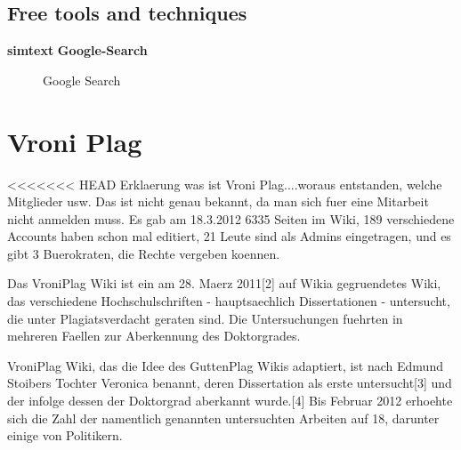 \newpage
\subsection{Free tools and techniques}

	\textbf{simtext}
	\textbf{Google-Search}

	 \begin{figure}[!h]
  \centering
  \caption{Google Search}
  \label{fig:Google Search}
\end{figure}






\newpage


\section{Vroni Plag}
<<<<<<< HEAD
Erklaerung was ist Vroni Plag....woraus entstanden, welche Mitglieder usw.
Das ist nicht genau bekannt, da man sich fuer eine Mitarbeit nicht anmelden muss. Es gab am 18.3.2012 6335 Seiten im Wiki, 189 verschiedene Accounts haben schon mal editiert, 21 Leute sind als Admins eingetragen, und es gibt 3 Buerokraten, die Rechte vergeben koennen. 

Das VroniPlag Wiki ist ein am 28. Maerz 2011[2] auf Wikia gegruendetes Wiki, das verschiedene Hochschulschriften - hauptsaechlich Dissertationen - untersucht, die unter Plagiatsverdacht geraten sind. Die Untersuchungen fuehrten in mehreren Faellen zur Aberkennung des Doktorgrades.

VroniPlag Wiki, das die Idee des GuttenPlag Wikis adaptiert, ist nach Edmund Stoibers Tochter Veronica benannt, deren Dissertation als erste untersucht[3] und der infolge dessen der Doktorgrad aberkannt wurde.[4] Bis Februar 2012 erhoehte sich die Zahl der namentlich genannten untersuchten Arbeiten auf 18, darunter einige von Politikern.

